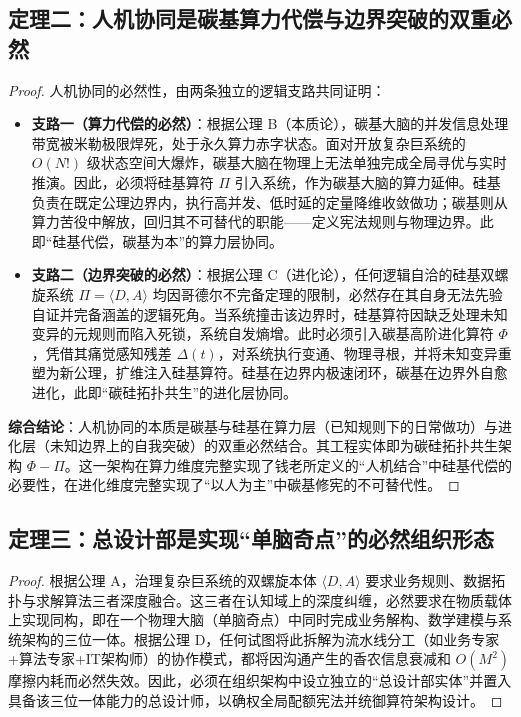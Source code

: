 \documentclass[11pt,a4paper]{article}
\begin{document}
\subsection*{定理二：人机协同是碳基算力代偿与边界突破的双重必然}
\begin{proof}
人机协同的必然性，由两条独立的逻辑支路共同证明：
\begin{itemize}
    \item \textbf{支路一（算力代偿的必然）}：根据公理 B（本质论），碳基大脑的并发信息处理带宽被米勒极限焊死，处于永久算力赤字状态。面对开放复杂巨系统的 $O(N!)$ 级状态空间大爆炸，碳基大脑在物理上无法单独完成全局寻优与实时推演。因此，必须将硅基算符 $\Pi$ 引入系统，作为碳基大脑的算力延伸。硅基负责在既定公理边界内，执行高并发、低时延的定量降维收敛做功；碳基则从算力苦役中解放，回归其不可替代的职能——定义宪法规则与物理边界。此即“硅基代偿，碳基为本”的算力层协同。
    \item \textbf{支路二（边界突破的必然）}：根据公理 C（进化论），任何逻辑自洽的硅基双螺旋系统 $\Pi=\langle D,A \rangle$ 均因哥德尔不完备定理的限制，必然存在其自身无法先验自证并完备涵盖的逻辑死角。当系统撞击该边界时，硅基算符因缺乏处理未知变异的元规则而陷入死锁，系统自发熵增。此时必须引入碳基高阶进化算符 $\Phi$，凭借其痛觉感知残差 $\Delta(t)$，对系统执行变通、物理寻根，并将未知变异重塑为新公理，扩维注入硅基算符。硅基在边界内极速闭环，碳基在边界外自愈进化，此即“碳硅拓扑共生”的进化层协同。
\end{itemize}
\textbf{综合结论}：人机协同的本质是碳基与硅基在算力层（已知规则下的日常做功）与进化层（未知边界上的自我突破）的双重必然结合。其工程实体即为碳硅拓扑共生架构 $\Phi - \Pi$。这一架构在算力维度完整实现了钱老所定义的“人机结合”中硅基代偿的必要性，在进化维度完整实现了“以人为主”中碳基修宪的不可替代性。
\end{proof}

\subsection*{定理三：总设计部是实现“单脑奇点”的必然组织形态}
\begin{proof}
根据公理 A，治理复杂巨系统的双螺旋本体 $\langle D,A \rangle$ 要求业务规则、数据拓扑与求解算法三者深度融合。这三者在认知域上的深度纠缠，必然要求在物质载体上实现同构，即在一个物理大脑（单脑奇点）中同时完成业务解构、数学建模与系统架构的三位一体。根据公理 D，任何试图将此拆解为流水线分工（如业务专家+算法专家+IT架构师）的协作模式，都将因沟通产生的香农信息衰减和 $O(M^2)$ 摩擦内耗而必然失效。因此，必须在组织架构中设立独立的“总设计部实体”并置入具备该三位一体能力的总设计师，以确权全局配额宪法并统御算符架构设计。
\end{proof}
\end{document}
